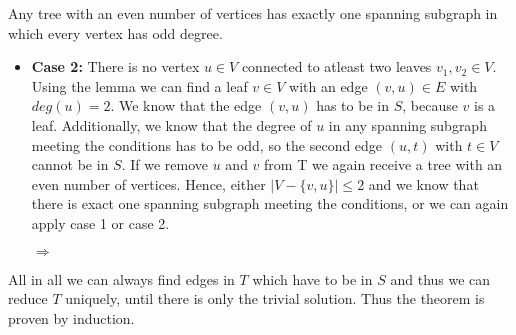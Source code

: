 \documentclass[a4paper]{article}
\begin{document}
\begin{solution}{6}
\begin{theorem}{Any tree with an even number of vertices has exactly one spanning subgraph in which every vertex has odd degree.}
\begin{itemize}
				
				\item \textbf{Case 2:} There is no vertex $u \in V$ connected to atleast two leaves $v_1, v_2 \in V$. \\
				Using the lemma we can find a leaf $v \in V$ with an edge $(v,u) \in E$ with $deg(u)=2$. 
				We know that the edge $(v,u)$ has to be in $S$, because $v$ is a leaf. 
				Additionally, we know that the degree of $u$ in any spanning subgraph meeting the conditions has to be odd, so the second edge $(u,t)$ with $t \in V$ cannot be in $S$. 
				If we remove $u$ and $v$ from T we again receive a tree with an even number of vertices. 
				Hence, either $|V- \{v,u\}| \leq 2$ and we know that there is exact one spanning subgraph meeting the conditions, or we can again apply case 1 or case 2. 
				\begin{center}
				 $\Rightarrow$
			\end{center}
			\end{itemize}
		All in all we can always find edges in $T$ which have to be in $S$ and thus we can reduce $T$ uniquely, until there is only the trivial solution. 
		Thus the theorem is proven by induction. 
		\end{theorem}
	\end{solution} 
	\newpage
\end{document}
